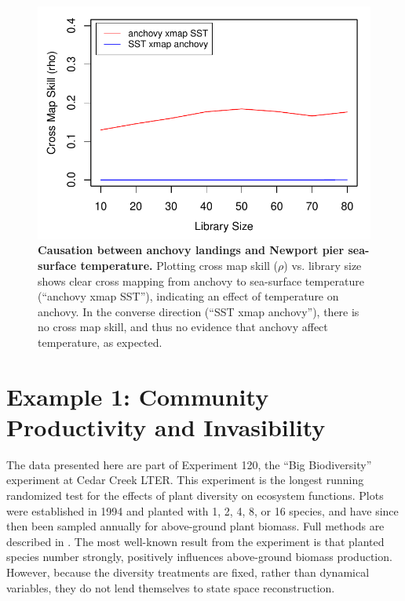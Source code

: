 \begin{figure}[!ht]
\begin{center}\includegraphics[width=\maxwidth{\textwidth}]{fig_redm_8.pdf}\end{center}
\caption[Causation between anchovy landings and Newport pier sea-surface temperature.]{\textbf{Causation between anchovy landings and Newport pier sea-surface temperature.}\newline
Plotting cross map skill ($\rho$) vs. library size shows clear cross mapping from anchovy to sea-surface temperature (``anchovy xmap SST''), indicating an effect of temperature on anchovy. In the converse direction (``SST xmap anchovy''), there is no cross map skill, and thus no evidence that anchovy affect temperature, as expected.}
\end{figure}

\section{Example 1: Community Productivity and Invasibility}

The data presented here are part of Experiment 120, the ``Big Biodiversity'' experiment at Cedar Creek LTER. This experiment is the longest running randomized test for the effects of plant diversity on ecosystem functions. Plots were established in 1994 and planted with 1, 2, 4, 8, or 16 species, and have since then been sampled annually for above-ground plant biomass. Full methods are described in \cite{Tilman_1997}. The most well-known result from the experiment is that planted species number strongly, positively influences above-ground biomass production. However, because the diversity treatments are fixed, rather than dynamical variables, they do not lend themselves to state space reconstruction.

